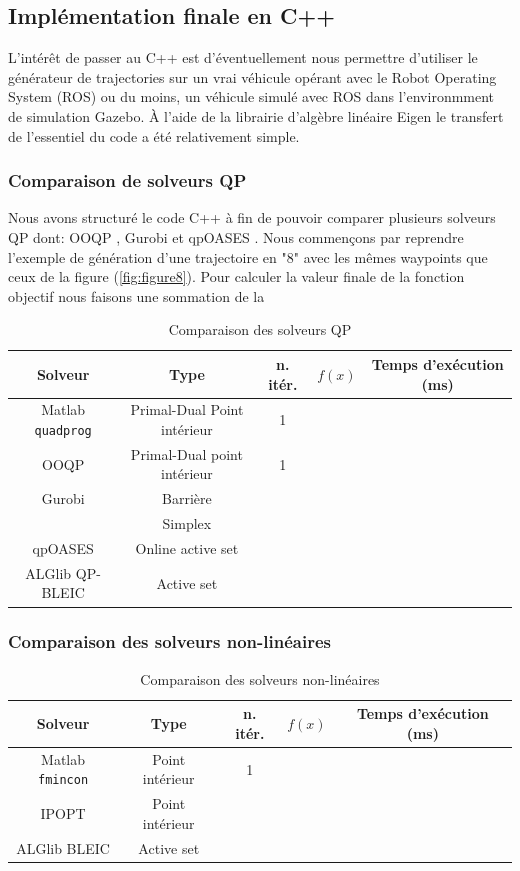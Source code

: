 \subsection{Implémentation finale en C++}
L'intérêt de passer au C++ est d'éventuellement nous permettre d'utiliser le générateur de trajectories sur un vrai véhicule opérant avec le Robot Operating System (ROS) ou du moins, un véhicule simulé avec ROS dans l'environmment de simulation Gazebo. À l'aide de la librairie d'algèbre linéaire Eigen \cite{eigenweb} le transfert de l'essentiel du code a été relativement simple.

\subsubsection{Comparaison de solveurs QP}

Nous avons structuré le code C++ à fin de pouvoir comparer plusieurs solveurs QP dont: OOQP \citep{ooqp}, Gurobi \citep{gurobi} et qpOASES \citep{Ferreau2014}. Nous commençons par reprendre l'exemple de génération d'une trajectoire en "8" avec les mêmes waypoints que ceux de la figure (\ref{fig:figure8}). Pour calculer la valeur finale de la fonction objectif nous faisons une sommation de la 

\begin{table}[htp]
	\centering
	\begin{tabular}{ |c|c|c|c|c| } 
 \hline
 Solveur & Type & n. itér. & $f(x)$ & Temps d'exécution (ms) \\ 
 \hline
	Matlab \texttt{quadprog} & Primal-Dual Point intérieur&1&&\\
	OOQP & Primal-Dual point intérieur &1&&\\
	Gurobi & Barrière &&&\\
	& Simplex &&&\\
	qpOASES & Online active set&&&\\
	ALGlib QP-BLEIC & Active set&&&\\
 \hline
\end{tabular}
	\caption{Comparaison des solveurs QP}
	\label{table:qp_comparison}
\end{table}

\subsubsection{Comparaison des solveurs non-linéaires}

\begin{table}[htp]
	\centering
	\begin{tabular}{ |c|c|c|c|c| } 
 \hline
 Solveur & Type & n. itér. & $f(x)$ & Temps d'exécution (ms) \\ 
 \hline
	Matlab \texttt{fmincon} & Point intérieur&1&&\\
	IPOPT & Point intérieur &&&\\
	ALGlib BLEIC & Active set &&&\\
 \hline
\end{tabular}
	\caption{Comparaison des solveurs non-linéaires}
	\label{table:nl_comparison}
\end{table}


